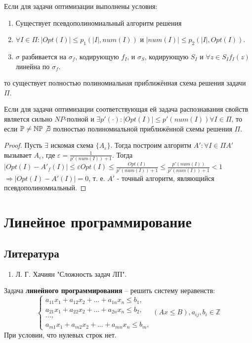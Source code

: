 \documentclass[11pt]{article}
\def\zall{\setcounter{lem}{0}\setcounter{cnsqnc}{0}\setcounter{th}{0}\setcounter{Cmt}{0}\setcounter{equation}{0}\setcounter{stnmt}{0}}
\newcounter{lem}\setcounter{lem}{0}
\newcounter{th}\setcounter{th}{0}
\newcounter{cnsqnc}\setcounter{cnsqnc}{0}
\newcounter{Cmt}\setcounter{Cmt}{0}
\newcounter{stnmt}\setcounter{stnmt}{0}
\def\st{\par\smallskip\refstepcounter{stnmt}\textbf{\arabic{stnmt}}}
\newtheorem*{Statement}{Утверждение \st}
\begin{document}
\begin{Statement}
Если для задачи оптимизации выполнены условия:
\begin{enumerate}
\item Существует псевдополиномиальный алгоритм решения
\item $\forall I \in \Pi: |Opt(I)| \leq p_1(|I|, num(I))$ и $|num(I)| \leq p_2(|I|, Opt(I))$.
\item $\sigma$ разбивается на $\sigma_f$, кодирующую $f_I$, и $\sigma_S$, кодирующую $S_I$ и $\forall z \in S_I f_I(z)$ линейна по $\sigma_f$.
\end{enumerate}
то существует полностью полиномиальная приближённая схема решения задачи $\Pi$.
\end{Statement}
\begin{Statement}
Если для задачи оптимизации соответствующая ей задача распознавания свойств является сильно
$NP$-полной и $\exists p'(\cdot): |Opt(I)| \leq p'(num(I)) \forall I \in \Pi$, то если
$\mathbb{P} \neq \mathbb{NP} \not\exists$ полностью полиномиальной приближённой схемы решения
$\Pi$.
\end{Statement}
\begin{proof}
Пусть $\exists$ искомая схема $\{A_{\varepsilon}\}$. Тогда построим алгоритм $A': \forall I \in \Pi A'$
вызывает $A_{\varepsilon}$, где $\varepsilon = \frac1{p'(num(I)) + 1}$. Тогда
$|Opt(I) - A'_f(I)| \leq \varepsilon Opt(I) \leq \frac{Opt(I)}{p'(num(I)) + 1} \leq \frac{p'(num(I))}{p'(num(I)) + 1} < 1$
$\Rightarrow |Opt(I) - A'(I)| = 0$, т. е. $A'$ - точный алгоритм, являющийся псевдополиномиальный.
\end{proof}
\section{Линейное программирование}
\label{sec:orge9648d4}
\subsection{Литература}
\label{sec:orga08a010}
\begin{enumerate}
\item Л. Г. Хачиян "Сложность задач ЛП".
\end{enumerate}

Задача \textbf{линейного программирования} -- решить систему неравенств:
\zall
\begin{equation}
\begin{cases}
a_{11}x_1 + a_{12}x_2 + \ldots + a_{1n}x_n \leq b_1, \\
a_{21}x_1 + a_{22}x_2 + \ldots + a_{2n}x_n \leq b_2, \\
\ldots, \\
a_{m1}x_1 + a_{m2}x_2 + \ldots + a_{mn}x_n \leq b_m,
\end{cases}
(Ax \leq B), a_{ij}, b_i \in \mathbb{Z}
\end{equation}
При условии, что нулевых строк нет.
\end{document}

